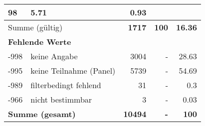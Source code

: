 \begin{longtable}{lXrrr}
       \num{98} &
       \num[round-mode=places,round-precision=2]{5,71} &
         \num[round-mode=places,round-precision=2]{0,93} \\
     \midrule
     \multicolumn{2}{l}{Summe (gültig)} &
       \textbf{\num{1717}} &
     \textbf{100} &
       \textbf{\num[round-mode=places,round-precision=2]{16,36}} \\
     \multicolumn{5}{l}{\textbf{Fehlende Werte}}\\
       -998 &
       keine Angabe &
         \num{3004} &
        - &
         \num[round-mode=places,round-precision=2]{28,63} \\
       -995 &
       keine Teilnahme (Panel) &
         \num{5739} &
        - &
         \num[round-mode=places,round-precision=2]{54,69} \\
       -989 &
       filterbedingt fehlend &
         \num{31} &
        - &
         \num[round-mode=places,round-precision=2]{0,3} \\
       -966 &
       nicht bestimmbar &
         \num{3} &
        - &
         \num[round-mode=places,round-precision=2]{0,03} \\
     \midrule
     \multicolumn{2}{l}{\textbf{Summe (gesamt)}} &
          \textbf{\num{10494}} &
        \textbf{-} &
        \textbf{100} \\
     \bottomrule
     \end{longtable}
     
